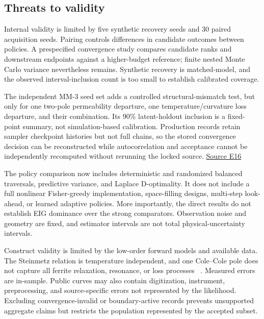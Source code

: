 \hypertarget{threats-to-validity}{%
\subsection{Threats to validity}\label{threats-to-validity}}

Internal validity is limited by five synthetic recovery seeds and 30
paired acquisition seeds. Pairing controls differences in candidate
outcomes between policies. A prespecified convergence study compares
candidate ranks and downstream endpoints against a higher-budget
reference; finite nested Monte Carlo variance nevertheless remains.
Synthetic recovery is matched-model, and the observed interval-inclusion
count is too small to establish calibrated coverage.

The independent MM-3 seed set adds a controlled structural-mismatch
test, but only for one two-pole permeability departure, one
temperature/curvature loss departure, and their combination. Its 90\%
latent-holdout inclusion is a fixed- point summary, not simulation-based
calibration. Production records retain sampler checkpoint histories but
not full chains, so the stored convergence decision can be reconstructed
while autocorrelation and acceptance cannot be independently recomputed
without rerunning the locked source.
\href{https://github.com/hoangduong6210/EIG-bayesian-for-Recover-potential-Physical-Parameter-of-MagComponent/blob/927bbcb6d0b862598fae87d2575a872bbd79b5f1/wiki/evidence/Evidence-Sources.md\#e16}{Source
E16}

The policy comparison now includes deterministic and randomized balanced
traversals, predictive variance, and Laplace D-optimality. It does not
include a full nonlinear Fisher-greedy implementation, space-filling
designs, multi-step look-ahead, or learned adaptive policies. More
importantly, the direct results do not establish EIG dominance over the
strong comparators. Observation noise and geometry are fixed, and
estimator intervals are not total physical-uncertainty intervals.

Construct validity is limited by the low-order forward models and
available data. The Steinmetz relation is temperature independent, and
one Cole--Cole pole does not capture all ferrite relaxation, resonance,
or loss processes ~\citep{tsutaoka2003}. Measured errors are in-sample.
Public curves may also contain digitization, instrument, preprocessing,
and source-specific errors not represented by the likelihood. Excluding
convergence-invalid or boundary-active records prevents unsupported
aggregate claims but restricts the population represented by the
accepted subset.

